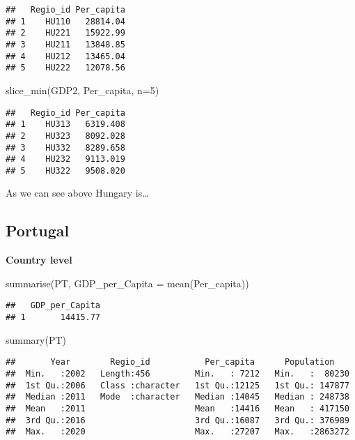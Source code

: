 \documentclass[
]{article}
\newenvironment{Shaded}{\begin{snugshade}}{\end{snugshade}}
\newcommand{\AttributeTok}[1]{\textcolor[rgb]{0.77,0.63,0.00}{#1}}
\newcommand{\DecValTok}[1]{\textcolor[rgb]{0.00,0.00,0.81}{#1}}
\newcommand{\FunctionTok}[1]{\textcolor[rgb]{0.00,0.00,0.00}{#1}}
\newcommand{\NormalTok}[1]{#1}
\begin{document}
\begin{verbatim}
##   Regio_id Per_capita
## 1    HU110   28814.04
## 2    HU221   15922.99
## 3    HU211   13848.85
## 4    HU212   13465.04
## 5    HU222   12078.56
\end{verbatim}

\begin{Shaded}
\begin{Highlighting}[]
\FunctionTok{slice\_min}\NormalTok{(GDP2, Per\_capita, }\AttributeTok{n=}\DecValTok{5}\NormalTok{)}
\end{Highlighting}
\end{Shaded}

\begin{verbatim}
##   Regio_id Per_capita
## 1    HU313   6319.408
## 2    HU323   8092.028
## 3    HU332   8289.658
## 4    HU232   9113.019
## 5    HU322   9508.020
\end{verbatim}

As we can see above Hungary is\ldots{}

\hypertarget{portugal}{%
\subsection{Portugal}\label{portugal}}

\textbf{Country level}

\begin{Shaded}
\begin{Highlighting}[]
    \FunctionTok{summarise}\NormalTok{(PT, }\AttributeTok{GDP\_per\_Capita =} \FunctionTok{mean}\NormalTok{(Per\_capita))}
\end{Highlighting}
\end{Shaded}

\begin{verbatim}
##   GDP_per_Capita
## 1       14415.77
\end{verbatim}

\begin{Shaded}
\begin{Highlighting}[]
\FunctionTok{summary}\NormalTok{(PT)}
\end{Highlighting}
\end{Shaded}

\begin{verbatim}
##       Year        Regio_id           Per_capita      Population     
##  Min.   :2002   Length:456         Min.   : 7212   Min.   :  80230  
##  1st Qu.:2006   Class :character   1st Qu.:12125   1st Qu.: 147877  
##  Median :2011   Mode  :character   Median :14045   Median : 248738  
##  Mean   :2011                      Mean   :14416   Mean   : 417150  
##  3rd Qu.:2016                      3rd Qu.:16087   3rd Qu.: 376989  
##  Max.   :2020                      Max.   :27207   Max.   :2863272
\end{verbatim}
\end{document}
